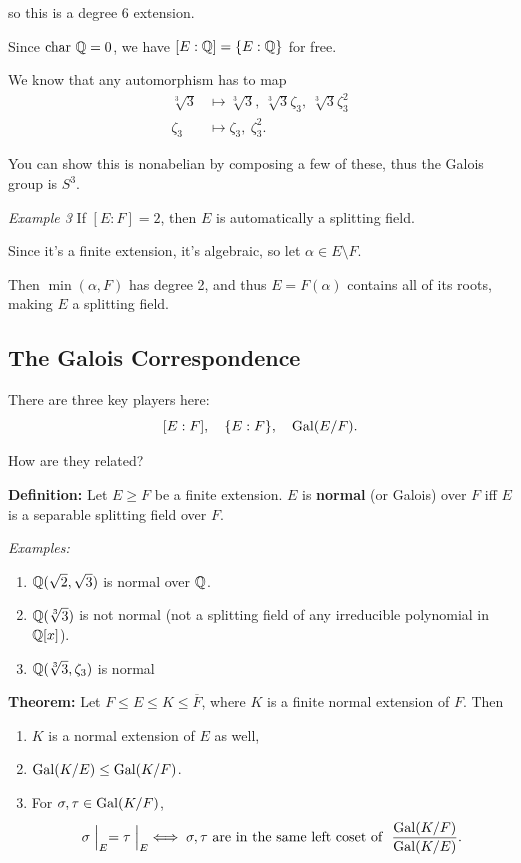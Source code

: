 so this is a degree 6 extension.

Since \(\mathrm{char}~ {\mathbb{Q}} = 0\), we have \([E: {\mathbb{Q}}] = \{E: {\mathbb{Q}}\}\) for free.

We know that any automorphism has to map \begin{align*}
\sqrt[3] 3 &\mapsto \sqrt[3] 3,~ \sqrt[3] 3 \zeta_3,~ \sqrt[3] 3 \zeta_3^2 \\
\zeta_3 &\mapsto \zeta_3,~ \zeta_3^2
.\end{align*}

You can show this is nonabelian by composing a few of these, thus the
Galois group is \(S^3\).

\emph{Example 3} If \([E: F] = 2\), then \(E\) is automatically a
splitting field.

Since it's a finite extension, it's algebraic, so let
\(\alpha \in E\setminus F\).

Then \(\min(\alpha, F)\) has degree 2, and thus \(E = F(\alpha)\)
contains all of its roots, making \(E\) a splitting field.

\hypertarget{the-galois-correspondence}{%
\subsection{The Galois Correspondence}\label{the-galois-correspondence}}

There are three key players here: \[
[E: F],\quad  \{E: F\},\quad \mathrm{Gal}(E/F)
.\]

How are they related?

\textbf{Definition:} Let \(E \geq F\) be a finite extension. \(E\) is
\textbf{normal} (or Galois) over \(F\) iff \(E\) is a separable
splitting field over \(F\).

\emph{Examples:}

\begin{enumerate}
\def\labelenumi{\arabic{enumi}.}
\item
  \({\mathbb{Q}}(\sqrt 2, \sqrt 3)\) is normal over \({\mathbb{Q}}\).
\item
  \({\mathbb{Q}}(\sqrt[3] 3)\) is not normal (not a splitting field of any
  irreducible polynomial in \({\mathbb{Q}}[x]\)).
\item
  \({\mathbb{Q}}(\sqrt[3] 3, \zeta_3)\) is normal
\end{enumerate}

\textbf{Theorem:} Let \(F \leq E \leq K \leq \overline F\), where \(K\)
is a finite normal extension of \(F\). Then

\begin{enumerate}
\def\labelenumi{\arabic{enumi}.}
\item
  \(K\) is a normal extension of \(E\) as well,
\item
  \(\mathrm{Gal}(K/E) \leq \mathrm{Gal}(K/F)\).
\item
  For \(\sigma, \tau \in \mathrm{Gal}(K/F)\), \[
  \sigma\mathrel{\Big|}_E = \tau\mathrel{\Big|}_E
  \iff
  \sigma, \tau \text{ are in the same left coset of }~
  \frac{\mathrm{Gal}(K/F)}{\mathrm{Gal}(K/E)}
  .\]
\end{enumerate}

